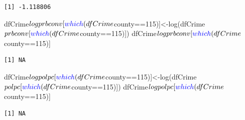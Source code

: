 \documentclass[]{article}
\newenvironment{Shaded}{}{}
\newcommand{\DecValTok}[1]{#1}
\newcommand{\KeywordTok}[1]{\textcolor[rgb]{0.00,0.00,1.00}{#1}}
\newcommand{\NormalTok}[1]{#1}
\newcommand{\OperatorTok}[1]{#1}
\newcommand{\StringTok}[1]{\textcolor[rgb]{0.00,0.50,0.50}{#1}}
\begin{document}
\begin{verbatim}
[1] -1.118806
\end{verbatim}

\begin{Shaded}
\begin{Highlighting}[]
\NormalTok{dfCrime}\OperatorTok{$}\NormalTok{logprbconv[}\KeywordTok{which}\NormalTok{(dfCrime}\OperatorTok{$}\NormalTok{county}\OperatorTok{==}\DecValTok{115}\NormalTok{)]<-}\KeywordTok{log}\NormalTok{(dfCrime}\OperatorTok{$}\NormalTok{prbconv[}\KeywordTok{which}\NormalTok{(dfCrime}\OperatorTok{$}\NormalTok{county}\OperatorTok{==}\DecValTok{115}\NormalTok{)])}
\NormalTok{dfCrime}\OperatorTok{$}\NormalTok{logprbconv[}\KeywordTok{which}\NormalTok{(dfCrime}\OperatorTok{$}\NormalTok{county}\OperatorTok{==}\DecValTok{115}\NormalTok{)]}
\end{Highlighting}
\end{Shaded}

\begin{verbatim}
[1] NA
\end{verbatim}

\begin{Shaded}
\begin{Highlighting}[]
\NormalTok{dfCrime}\OperatorTok{$}\NormalTok{logpolpc[}\KeywordTok{which}\NormalTok{(dfCrime}\OperatorTok{$}\NormalTok{county}\OperatorTok{==}\DecValTok{115}\NormalTok{)]<-}\KeywordTok{log}\NormalTok{(dfCrime}\OperatorTok{$}\NormalTok{polpc[}\KeywordTok{which}\NormalTok{(dfCrime}\OperatorTok{$}\NormalTok{county}\OperatorTok{==}\DecValTok{115}\NormalTok{)])}
\NormalTok{dfCrime}\OperatorTok{$}\NormalTok{logpolpc[}\KeywordTok{which}\NormalTok{(dfCrime}\OperatorTok{$}\NormalTok{county}\OperatorTok{==}\DecValTok{115}\NormalTok{)]}
\end{Highlighting}
\end{Shaded}

\begin{verbatim}
[1] NA
\end{verbatim}

\begin{Shaded}
\end{Shaded}
\end{document}
